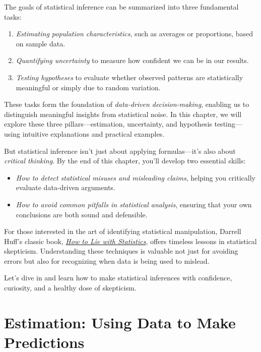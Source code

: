 \documentclass[
]{book}
\providecommand{\tightlist}{%
  \setlength{\itemsep}{0pt}\setlength{\parskip}{0pt}}
\theoremstyle{definition}
\theoremstyle{definition}
\theoremstyle{definition}
\theoremstyle{definition}
\theoremstyle{remark}
\begin{document}
The goals of statistical inference can be summarized into three fundamental tasks:

\begin{enumerate}
\def\labelenumi{\arabic{enumi}.}
\tightlist
\item
  \emph{Estimating population characteristics}, such as averages or proportions, based on sample data.\\
\item
  \emph{Quantifying uncertainty} to measure how confident we can be in our results.\\
\item
  \emph{Testing hypotheses} to evaluate whether observed patterns are statistically meaningful or simply due to random variation.
\end{enumerate}

These tasks form the foundation of \emph{data-driven decision-making}, enabling us to distinguish meaningful insights from statistical noise. In this chapter, we will explore these three pillars---estimation, uncertainty, and hypothesis testing---using intuitive explanations and practical examples.

But statistical inference isn't just about applying formulas---it's also about \emph{critical thinking}. By the end of this chapter, you'll develop two essential skills:

\begin{itemize}
\tightlist
\item
  \emph{How to detect statistical misuses and misleading claims}, helping you critically evaluate data-driven arguments.\\
\item
  \emph{How to avoid common pitfalls in statistical analysis}, ensuring that your own conclusions are both sound and defensible.
\end{itemize}

For those interested in the art of identifying statistical manipulation, Darrell Huff's classic book, \href{https://www.goodreads.com/book/show/51291.How_to_Lie_with_Statistics}{\emph{How to Lie with Statistics}}, offers timeless lessons in statistical skepticism. Understanding these techniques is valuable not just for avoiding errors but also for recognizing when data is being used to mislead.

Let's dive in and learn how to make statistical inferences with confidence, curiosity, and a healthy dose of skepticism.

\section{Estimation: Using Data to Make Predictions}\label{estimation-using-data-to-make-predictions}
\end{document}
